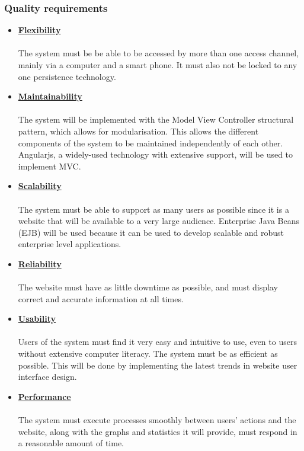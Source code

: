 \documentclass[a4paper,12pt]{article}
\begin{document}
\subsubsection{Quality requirements}
	\begin{itemize}
		\item{\bfseries \underline{Flexibility}}\\\\
		The system must be be able to be accessed  by more than one access channel, mainly via a computer and a 		 		smart phone. It must also not be locked to any one persistence technology. 
		\item{\bfseries \underline{Maintainability}}\\\\
		The system will be implemented with the Model View Controller structural pattern, which allows for modularisation. This 			allows the different components of the system to be maintained independently of each other. Angularjs, a 					widely-used technology with extensive support, will be used to implement MVC.
		
		\item{\bfseries \underline{Scalability}}\\\\
		The system must be able to support as many users as possible since it is a website that will be available to a very large 			audience. Enterprise Java Beans (EJB) will be used because it can be used to develop scalable and robust enterprise 			level applications.
		
		\item{\bfseries \underline{Reliability}}\\\\
		The website must have as little downtime as possible, and must display correct and accurate information at all times.
		
		\item{\bfseries \underline{Usability}}\\\\
		Users of the system must find it very easy and intuitive to use, even to users without extensive computer literacy. The 			system must be as efficient as possible. This will be done by implementing the latest trends in website user interface 			design.
		
		\item{\bfseries \underline{Performance}}\\\\
		The system must execute processes smoothly between users' actions and the website, along with the graphs and 			statistics it will provide, must respond in a reasonable amount of time.
		

\end{itemize}
\end{document}
